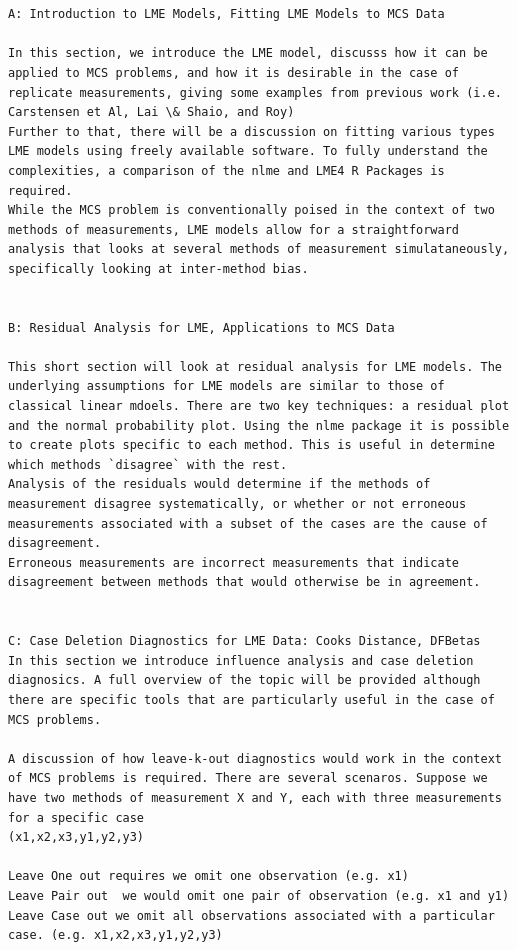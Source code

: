 \documentclass[Main.tex]{subfiles}
\begin{document}
\setcounter{tocdepth}{1}

\begin{verbatim}


A: Introduction to LME Models, Fitting LME Models to MCS Data

In this section, we introduce the LME model, discusss how it can be applied to MCS problems, and how it is desirable in the case of replicate measurements, giving some examples from previous work (i.e. Carstensen et Al, Lai \& Shaio, and Roy)
Further to that, there will be a discussion on fitting various types LME models using freely available software. To fully understand the complexities, a comparison of the nlme and LME4 R Packages is required.
While the MCS problem is conventionally poised in the context of two methods of measurements, LME models allow for a straightforward analysis that looks at several methods of measurement simulataneously, specifically looking at inter-method bias.


B: Residual Analysis for LME, Applications to MCS Data

This short section will look at residual analysis for LME models. The underlying assumptions for LME models are similar to those of classical linear mdoels. There are two key techniques: a residual plot and the normal probability plot. Using the nlme package it is possible to create plots specific to each method. This is useful in determine which methods `disagree` with the rest.
Analysis of the residuals would determine if the methods of measurement disagree systematically, or whether or not erroneous measurements associated with a subset of the cases are the cause of disagreement.
Erroneous measurements are incorrect measurements that indicate disagreement between methods that would otherwise be in agreement.


C: Case Deletion Diagnostics for LME Data: Cooks Distance, DFBetas
In this section we introduce influence analysis and case deletion diagnosics. A full overview of the topic will be provided although there are specific tools that are particularly useful in the case of MCS problems.

A discussion of how leave-k-out diagnostics would work in the context of MCS problems is required. There are several scenaros. Suppose we have two methods of measurement X and Y, each with three measurements for a specific case
(x1,x2,x3,y1,y2,y3)

Leave One out requires we omit one observation (e.g. x1)
Leave Pair out  we would omit one pair of observation (e.g. x1 and y1)
Leave Case out we omit all observations associated with a particular case. (e.g. x1,x2,x3,y1,y2,y3)



\end{verbatim}
\end{document}
